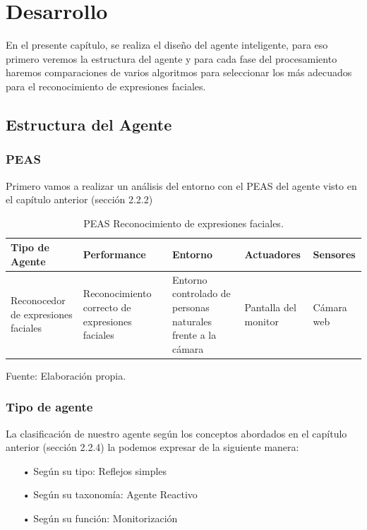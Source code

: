 \chapter{Desarrollo}

En el presente capítulo, se realiza  el diseño del agente inteligente, para eso primero veremos la estructura del agente y para cada fase del procesamiento haremos comparaciones de varios algoritmos para seleccionar los más adecuados para el reconocimiento de expresiones faciales.

\section{Estructura del Agente}
\subsection{PEAS}
Primero vamos a realizar un análisis del entorno con el PEAS del agente visto en el capítulo anterior (sección 2.2.2) 

\begin{table}[ht!]
\centering
\caption{PEAS Reconocimiento de expresiones faciales.} \vskip 0.1cm
\begin{tabular}{|p{2.7cm} |p{3cm} |p{3.8cm} |p{2cm} |p{2.1cm}|}  \hline 
\bf Tipo de Agente & \bf Performance & \bf Entorno & \bf Actuadores & \bf Sensores \\ \hline 
Reconocedor de expresiones faciales & Reconocimiento correcto de expresiones faciales & Entorno controlado de personas naturales frente a la cámara & Pantalla del monitor & Cámara web \\ \hline
\end{tabular} 
\begin{center}
{\small{Fuente: Elaboración propia.}}
\end{center}
\end{table}

\subsection{Tipo de agente}
La clasificación de nuestro agente según los conceptos abordados en el capítulo anterior (sección 2.2.4)  la podemos expresar de la siguiente manera:

\begin{itemize}
\item[•] Según su tipo: Reflejos simples
\item[•] Según su taxonomía: Agente Reactivo
\item[•] Según su función: Monitorización
\end{itemize}

